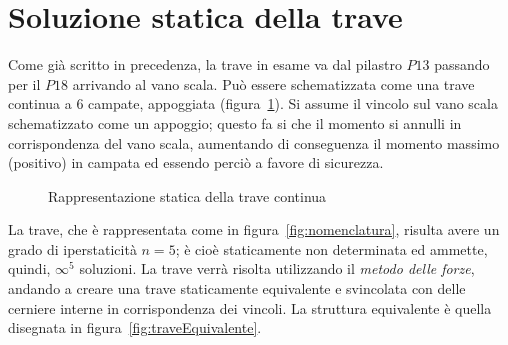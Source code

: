 \section{Soluzione statica della trave}
Come già scritto in precedenza, la trave in esame va dal pilastro $P13$ passando per il $P18$ arrivando al vano scala. 
Può essere schematizzata come una trave continua a 6 campate, appoggiata (figura~\ref{fig:trave}). Si assume il vincolo sul vano scala schematizzato come un appoggio; questo fa si che il momento si annulli in corrispondenza del vano scala, aumentando di conseguenza il momento massimo (positivo) in campata ed essendo perciò a favore di sicurezza.

\begin{figure}
 \centering
    \caption{Rappresentazione statica della trave continua}
    \label{fig:trave}
\end{figure}

La trave, che è rappresentata come in figura~\ref{fig:nomenclatura}, risulta avere un grado di iperstaticità $n=5$; è cioè staticamente non determinata ed ammette, quindi, $\infty^5$ soluzioni. La trave verrà risolta utilizzando il \emph{metodo delle forze}, andando a creare una trave staticamente equivalente e svincolata con delle cerniere interne in corrispondenza dei vincoli. La struttura equivalente è quella disegnata in figura~\ref{fig:traveEquivalente}.

